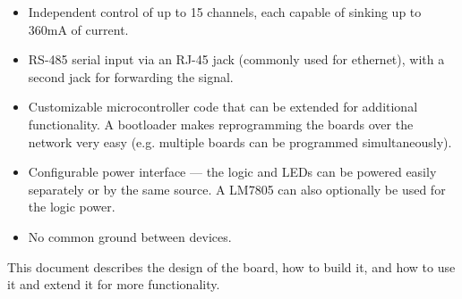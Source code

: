 \begin{itemize}
    \item Independent control of up to 15 channels, each capable of sinking up
    to 360mA of current.
    
    \item RS-485 serial input via an RJ-45 jack (commonly used for ethernet),
    with a second jack for forwarding the signal.

    \item Customizable microcontroller code that can be extended for additional
    functionality.  A bootloader makes reprogramming the boards over the
    network very easy (e.g. multiple boards can be programmed simultaneously).

    \item Configurable power interface --- the logic and LEDs can be powered
    easily separately or by the same source.  A LM7805 can also optionally be
    used for the logic power.

    \item No common ground between devices.
\end{itemize}

This document describes the design of the board, how to build it, and how to
use it and extend it for more functionality.
